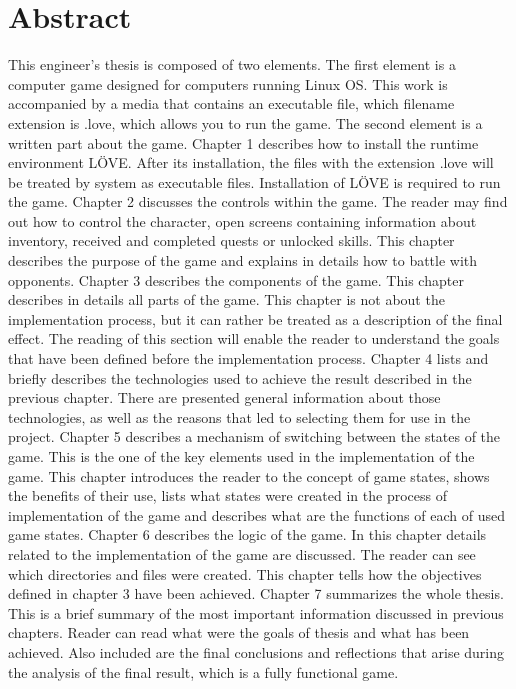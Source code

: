 \chapter*{Abstract}
This engineer's thesis is composed of two elements. The first element is
a computer game designed for computers running Linux OS. This work is
accompanied by a media that contains an executable file, which filename
extension is .love, which allows you to run the game. The second element is
a written part about the game.
Chapter 1 describes how to install the runtime environment LÖVE. After its
installation, the files with the extension .love will be treated by system as
executable files. Installation of LÖVE is required to run the game.
Chapter 2 discusses the controls within the game. The reader may find out how to
control the character, open screens containing information about inventory,
received and completed quests or unlocked skills. This chapter describes the
purpose of the game and explains in details how to battle with opponents.
Chapter 3 describes the components of the game. This chapter describes in
details all parts of the game. This chapter is not about the implementation
process, but it can rather be treated as a description of the final
effect. The reading of this section will enable the reader to understand the
goals that have been defined before the implementation process.
Chapter 4 lists and briefly describes the technologies used to achieve the
result described in the previous chapter. There are presented general
information about those technologies, as well as the reasons that led to
selecting them for use in the project.
Chapter 5 describes a mechanism of switching between the states of the game.
This is the one of the key elements used in the implementation of the game.
This chapter introduces the reader to the concept of game states, shows the
benefits of their use, lists what states were created in the process of
implementation of the game and describes what are the functions of each of
used game states.
Chapter 6 describes the logic of the game. In this chapter details related to
the implementation of the game are discussed. The reader can see which
directories and files were created. This chapter tells how the objectives
defined in chapter 3 have been achieved.
Chapter 7 summarizes the whole thesis. This is a brief summary of the most
important information discussed in previous chapters. Reader can read
what were the goals of thesis and what has been achieved. Also included are
the final conclusions and reflections that arise during the analysis of the
final result, which is a fully functional game.